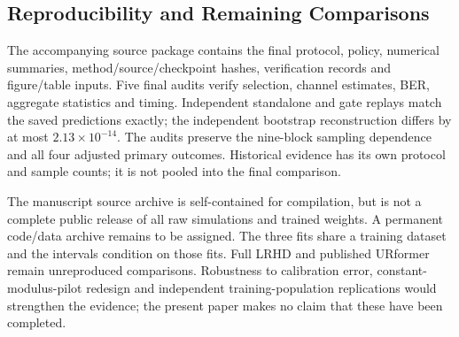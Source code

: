 \subsection{Reproducibility and Remaining Comparisons}
The accompanying source package contains the final protocol, policy, numerical summaries, method/source/checkpoint hashes, verification records and figure/table inputs. Five final audits verify selection, channel estimates, BER, aggregate statistics and timing. Independent standalone and gate replays match the saved predictions exactly; the independent bootstrap reconstruction differs by at most $2.13\times10^{-14}$. The audits preserve the nine-block sampling dependence and all four adjusted primary outcomes. Historical evidence has its own protocol and sample counts; it is not pooled into the final comparison.

The manuscript source archive is self-contained for compilation, but is not a complete public release of all raw simulations and trained weights. A permanent code/data archive remains to be assigned. The three fits share a training dataset and the intervals condition on those fits. Full LRHD and published URformer remain unreproduced comparisons. Robustness to calibration error, constant-modulus-pilot redesign and independent training-population replications would strengthen the evidence; the present paper makes no claim that these have been completed.
